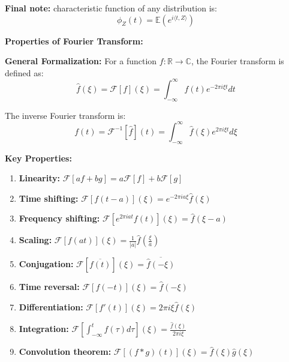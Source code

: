\begin{answerenum}
    \item \textbf{Final note:} characteristic function of any distribution is:
        \[ \phi_Z(t) = \mathbb{E}(e^{i\langle t,Z\rangle}) \]
        
        \textbf{Properties of Fourier Transform:}

        \textbf{General Formalization:}
        For a function $f: \mathbb{R} \to \mathbb{C}$, the Fourier transform is defined as:
        \[ \hat{f}(\xi) = \mathcal{F}[f](\xi) = \int_{-\infty}^{\infty} f(t) e^{-2\pi i \xi t} dt \]

        The inverse Fourier transform is:
        \[ f(t) = \mathcal{F}^{-1}[\hat{f}](t) = \int_{-\infty}^{\infty} \hat{f}(\xi) e^{2\pi i \xi t} d\xi \]

        \textbf{Key Properties:}
        \begin{enumerate}
            \item \textbf{Linearity:} $\mathcal{F}[af + bg] = a\mathcal{F}[f] + b\mathcal{F}[g]$
            
            \item \textbf{Time shifting:} $\mathcal{F}[f(t-a)](\xi) = e^{-2\pi i a \xi} \hat{f}(\xi)$
            
            \item \textbf{Frequency shifting:} $\mathcal{F}[e^{2\pi i a t} f(t)](\xi) = \hat{f}(\xi - a)$
            
            \item \textbf{Scaling:} $\mathcal{F}[f(at)](\xi) = \frac{1}{|a|} \hat{f}\left(\frac{\xi}{a}\right)$
            
            \item \textbf{Conjugation:} $\mathcal{F}[\overline{f(t)}](\xi) = \overline{\hat{f}(-\xi)}$
            
            \item \textbf{Time reversal:} $\mathcal{F}[f(-t)](\xi) = \hat{f}(-\xi)$
            
            \item \textbf{Differentiation:} $\mathcal{F}[f'(t)](\xi) = 2\pi i \xi \hat{f}(\xi)$
            
            \item \textbf{Integration:} $\mathcal{F}\left[\int_{-\infty}^t f(\tau) d\tau\right](\xi) = \frac{\hat{f}(\xi)}{2\pi i \xi}$
            
            \item \textbf{Convolution theorem:} $\mathcal{F}[(f * g)(t)](\xi) = \hat{f}(\xi) \hat{g}(\xi)$
            

\end{enumerate}
\end{answerenum}
